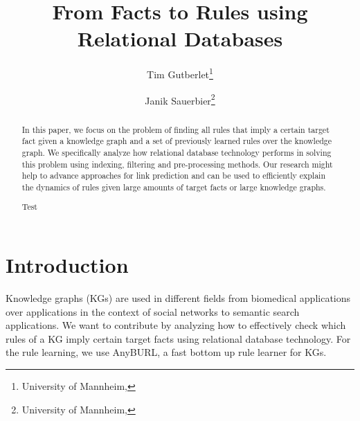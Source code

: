 \documentclass[english]{lni}
\begin{document}
\title[From Facts to Rules using Relational Databases]{From Facts to Rules using Relational Databases}
\author[Tim Gutberlet \and Janik Sauerbier]
{Tim Gutberlet\footnote{University of Mannheim, } \and
Janik Sauerbier\footnote{University of Mannheim, }}
\maketitle

\begin{abstract}
In this paper, we focus on the problem of finding all rules that imply a certain target fact given a knowledge graph and a set of previously learned rules over the knowledge graph. We specifically analyze how relational database technology performs in solving this problem using indexing, filtering and pre-processing methods. Our research might help to advance approaches for link prediction and can be used to efficiently explain the dynamics of rules given large amounts of target facts or large knowledge graphs.

Test
\end{abstract}
\section{Introduction}
Knowledge graphs (KGs) are used in different fields from biomedical applications \cite{OpenBioLink} over applications in the context of social networks \cite{SocialNetworks} to semantic search applications\cite{SemanticSearch}. We want to contribute by analyzing how to effectively check which rules of a KG imply certain target facts using relational database technology. For the rule learning, we use AnyBURL, a fast bottom up rule learner for KGs.\cite{AnyBURL19}
\end{document}
